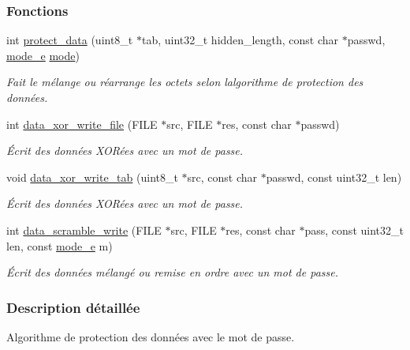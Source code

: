 \subsubsection*{Fonctions}
\begin{DoxyCompactItemize}
\item 
int \hyperlink{a00119_a3fd0a8f9ba189acd34f864c97f059b0f}{protect\+\_\+data} (uint8\+\_\+t $\ast$tab, uint32\+\_\+t hidden\+\_\+length, const char $\ast$passwd, \hyperlink{a00008_a3410d2f61b2ebef290660e7d14215bbd}{mode\+\_\+e} \hyperlink{a00008_a1a6b6fb557d8d37d59700faf4e4c9167}{mode})
\begin{DoxyCompactList}\small\item\em Fait le mélange ou réarrange les octets selon l\textquotesingle{}algorithme de protection des données. \end{DoxyCompactList}\item 
\mbox{\label{a00119_aed2bc32539848b035b9ad4fc2efd98e8}} 
int \hyperlink{a00119_aed2bc32539848b035b9ad4fc2efd98e8}{data\+\_\+xor\+\_\+write\+\_\+file} (F\+I\+LE $\ast$src, F\+I\+LE $\ast$res, const char $\ast$passwd)
\begin{DoxyCompactList}\small\item\em Écrit des données X\+O\+Rées avec un mot de passe. \end{DoxyCompactList}\item 
void \hyperlink{a00119_a7a07539cd0f2054ed61e4300f1e9a3d5}{data\+\_\+xor\+\_\+write\+\_\+tab} (uint8\+\_\+t $\ast$src, const char $\ast$passwd, const uint32\+\_\+t len)
\begin{DoxyCompactList}\small\item\em Écrit des données X\+O\+Rées avec un mot de passe. \end{DoxyCompactList}\item 
int \hyperlink{a00119_af1d405b272ef2dc101b959264bad47e1}{data\+\_\+scramble\+\_\+write} (F\+I\+LE $\ast$src, F\+I\+LE $\ast$res, const char $\ast$pass, const uint32\+\_\+t len, const \hyperlink{a00008_a3410d2f61b2ebef290660e7d14215bbd}{mode\+\_\+e} m)
\begin{DoxyCompactList}\small\item\em Écrit des données mélangé ou remise en ordre avec un mot de passe. \end{DoxyCompactList}\end{DoxyCompactItemize}


\subsubsection{Description détaillée}
Algorithme de protection des données avec le mot de passe. 

